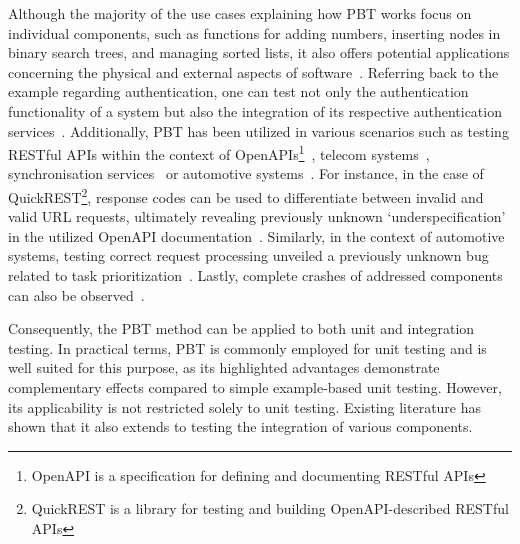 \documentclass[runningheads]{llncs}
\begin{document}
Although the majority of the use cases explaining how PBT works focus on individual components, such as functions for adding numbers, inserting nodes in binary search trees,
and managing sorted lists, it also offers potential applications concerning the physical and external aspects of software~\cite{Chen2022}. Referring back to the example regarding authentication, one can test not only the authentication functionality of a system but also the integration of its respective authentication services~\cite{Fink1997}. Additionally, PBT has been utilized in various scenarios such as testing RESTful APIs within the context of OpenAPIs\footnote{OpenAPI is a specification for defining and documenting RESTful APIs}~\cite{Karlsson2019}, telecom systems~\cite{Arts2006}, synchronisation services~\cite{Hughes2016} or automotive systems~\cite{Arts2015}. For instance, in the case of QuickREST\footnote{QuickREST is a library for testing and building OpenAPI-described RESTful APIs}, response codes can be used to differentiate between invalid and valid URL requests, ultimately revealing previously unknown `underspecification' in the utilized OpenAPI documentation~\cite{Karlsson2019}. Similarly, in the context of automotive systems, testing correct request processing unveiled a previously unknown bug related to task prioritization~\cite{Arts2015}. Lastly, complete crashes of addressed components can also be observed~\cite{Arts2006}.

Consequently, the PBT method can be applied to both unit and integration testing. In practical terms, PBT is commonly employed for unit testing and is well suited for this purpose, as its highlighted advantages demonstrate complementary effects compared to simple example-based unit testing. However, its applicability is not restricted solely to unit testing. Existing literature has shown that it also extends to testing the integration of various components.
\end{document}
